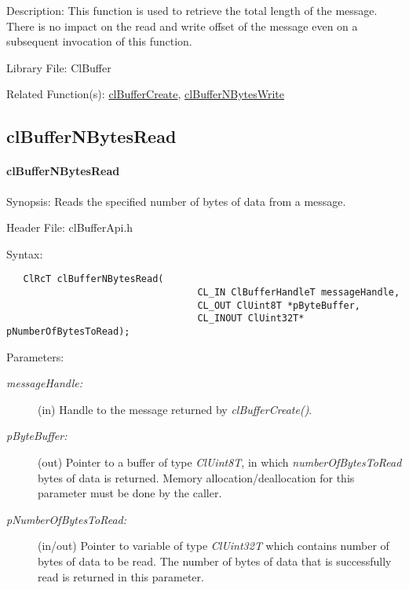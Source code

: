 \begin{Desc}
\item[Description:]This function is used to retrieve the total length of the message. There is no impact on the read and write offset of the message even
on a subsequent invocation of this function.\end{Desc}
\begin{Desc}
\item[Library File:]Cl\-Buffer\end{Desc}
\begin{Desc}
\item[Related Function(s):]\hyperlink{pagebuf103}{cl\-Buffer\-Create}, \hyperlink{pagebuf109}{cl\-Buffer\-NBytes\-Write} \end{Desc}


\newpage
\subsection{clBufferNBytesRead}
\hypertarget{pagebuf108}{}\paragraph{cl\-Buffer\-NBytes\-Read}\label{pagebuf108}
\begin{Desc}
\item[Synopsis:]Reads the specified number of bytes of data from a message.\end{Desc}
\begin{Desc}
\item[Header File:]clBufferApi.h\end{Desc}
\begin{Desc}
\item[Syntax:]

\footnotesize\begin{verbatim}   ClRcT clBufferNBytesRead(
                      		      CL_IN ClBufferHandleT messageHandle,
                      		      CL_OUT ClUint8T *pByteBuffer,
                      		      CL_INOUT ClUint32T* pNumberOfBytesToRead);
                     \end{verbatim}
\normalsize
\end{Desc}
\begin{Desc}
\item[Parameters:]
\begin{description}
\item[{\em message\-Handle:}](in) Handle to the message returned by \textit{clBufferCreate()}. 
\item[{\em p\-Byte\-Buffer:}](out) Pointer to a buffer of type {\em Cl\-Uint8T\/}, in which {\em number\-Of\-Bytes\-To\-Read\/} bytes of data is
returned. Memory allocation/deallocation for this parameter must be done by the caller. 
\item[{\em p\-Number\-Of\-Bytes\-To\-Read:}](in/out) Pointer to variable of type {\em Cl\-Uint32T\/} which contains number of bytes of data to be read.
The number of bytes of data that is successfully read is returned in this parameter.\end{description}
\end{Desc}
